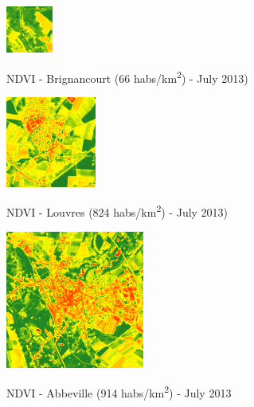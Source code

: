\documentclass[c]{beamer}
\begin{document}
\begin{frame}
\begin{columns}
\begin{column}{0.25\textwidth}
 \begin{overlayarea}{\linewidth}{0.5cm}
  \centering\vfill
  \includegraphics[scale=0.17]{images/Brignancourt/07_ndvi.png}
  \end{overlayarea}
  \begin{overlayarea}{\linewidth}{0.5cm}
  \centering
  \tiny NDVI - Brignancourt (66 habs/km\textsuperscript{2}) - July 2013) \par
  \end{overlayarea}
  
  \begin{overlayarea}{\linewidth}{0.9cm}
  \centering\vfill
  \includegraphics[scale=0.17]{images/Louvres/07_ndvi.png}
  \end{overlayarea}
  \begin{overlayarea}{\linewidth}{0.5cm}
  \centering
  \tiny NDVI - Louvres (824 habs/km\textsuperscript{2}) - July 2013) \par
  \end{overlayarea}
  
  \begin{overlayarea}{\linewidth}{1.2cm}
  \centering\vfill
  \includegraphics[scale=0.17]{images/Abbeville/07_ndvi.png}
  \end{overlayarea}
  \begin{overlayarea}{\linewidth}{0.5cm}
  \centering
  \tiny NDVI - Abbeville (914 habs/km\textsuperscript{2}) - July 2013 \par
  \end{overlayarea}
  

\end{column}
\end{columns}
\end{frame}
\end{document}
